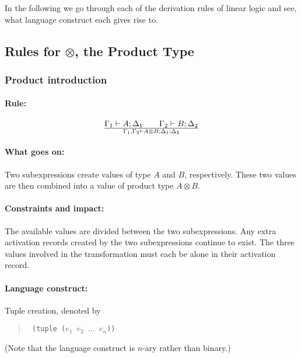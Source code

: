 \documentclass[a4paper]{article}
\begin{document}
In the following we go through each of the derivation rules of linear
logic and see, what language construct each gives rise to.


\subsection{Rules for $\otimes$, the Product Type}

\subsubsection{Product introduction}
\paragraph{Rule:}
$$
{
 {\Gamma_1 \vdash A;\Delta_1}
 \qquad
 {\Gamma_2 \vdash B;\Delta_2}
}\over{
 \Gamma_1, \Gamma_2 \vdash A \otimes B ; \Delta_1 ; \Delta_2
}
$$

\paragraph{What goes on:} Two subexpressions create values of type $A$
and $B$, respectively. These two values are then combined into a value
of product type $A \otimes B$.


\paragraph{Constraints and impact:} The available values are divided
between the two subexpressions.  Any extra activation records created
by the two subexpressions continue to exist.
The three values involved in the transformation must each be alone in
their activation record.

\paragraph{Language construct:} Tuple creation, denoted by
\begin{quote}\tt
  (tuple ($e_1$ $e_2$ $\ldots$ $e_n$))
\end{quote}
(Note that the language construct is $n$-ary rather than binary.)
\end{document}
